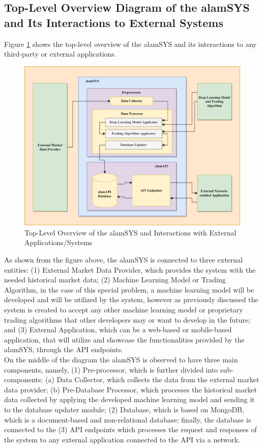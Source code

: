 \subsection{Top-Level Overview Diagram of the alamSYS and Its Interactions to External Systems}
\label{subsec:top_level_overview}

Figure \ref{fig:system_overview} shows the top-level overview of the 
alamSYS and its interactions to any third-party or external applications.

\begin{figure}[ht]
    \centering
    \includegraphics[width=1\textwidth]{./assets/Chapter_3/SystemOverview.png}
    \caption{Top-Level Overview of the alamSYS and Interactions with External Applications/Systems}
    \label{fig:system_overview}
\end{figure}
\FloatBarrier

As shown from the figure above, the alamSYS is connected to three external 
entities: (1) External Market Data Provider, which provides the system with the 
needed historical market data; (2) Machine Learning Model or Trading Algorithm, 
in the case of this special problem, a machine learning model will be developed and 
will be utilized by the system, however as previously discussed the system is 
created to accept any other machine learning model or proprietary trading algorithms 
that other developers may or want to develop in the future; and 
(3) External Application, which can be a web-based or mobile-based application, that
will utilize and showcase the functionalities provided by the alamSYS, through the
API endpoints.
\hfill \\

On the middle of the diagram the alamSYS is observed to have three main components, 
namely, (1) Pre-processor, which is further divided into sub-components: 
(a) Data Collector, which collects the data from the external market data provider; 
(b) Pre-Database Processor, which processes the historical market data collected by 
applying the developed machine learning model and sending it to the database updater 
module; (2) Database, which is based on MongoDB, which is a document-based and non-relational 
database; finally, the database is connected to the (3) API endpoints which processes 
the request and responses of the system to any external application connected to the 
API via a network.